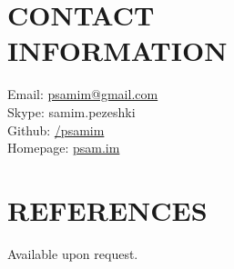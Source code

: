 \documentclass[margin, 10pt]{res} %
\begin{document}
\begin{resume}

\section{CONTACT \\ INFORMATION}
Email: \href{mailto:psamim@gmail.com}{psamim@gmail.com} \\
Skype: samim.pezeshki \\
Github: \href{http://github.com/psamim}{/\/psamim} \\
Homepage: \href{http://www.psam.im/}{psam.im} \\

\section{REFERENCES}
Available upon request.


\end{resume}
\end{document}
